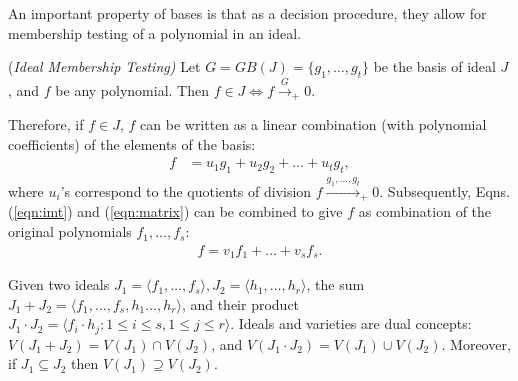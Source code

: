 An important property of \Grobner bases is that as a decision
procedure, they allow for membership testing of a polynomial in an
ideal. 

\begin{Proposition}
\label{prop:imt}
({\it Ideal Membership Testing)
} 
Let $G = GB(J) = \{g_1,\dots,g_t\}$ be the \Grobner basis of ideal
$J$, and $f$ be any polynomial. Then $f\in J \iff f\xrightarrow{G}_+0$.
\end{Proposition}

Therefore, if $f\in J$, $f$ can
be written as a linear combination (with polynomial coefficients) of
the elements of the \Grobner basis: 
\vspace{-0.1in}
\begin{align}\label{eqn:imt}
f & = u_1g_1 + u_2g_2+ \dots+ u_tg_t,
\end{align}
where $u_i$'s correspond to the quotients of division
$f\xrightarrow{g_1,\dots,g_t}_+0$. Subsequently, Eqns. (\ref{eqn:imt})
and (\ref{eqn:matrix}) can be combined to give $f$ as combination of
the original polynomials $f_1,\dots,f_s$:
\begin{align}\label{eqn:imt_orig}
f = v_1f_1 +\dots+v_sf_s.
\end{align}




Given two ideals $J_1 = \langle f_1,\dots,f_s\rangle, J_2=\langle
h_1,\dots,h_r\rangle$, the sum $J_1 + J_2 = \langle
f_1,\dots,f_s,h_1\dots,h_r\rangle$, and their product $J_1\cdot J_2 =
\langle f_i\cdot h_j: 1\leq i\leq s, 1\leq j\leq r\rangle$. Ideals and
varieties are dual concepts: $V(J_1 + J_2) = V(J_1) \cap V(J_2)$, and
$V(J_1\cdot J_2) = V(J_1) \cup V(J_2)$. Moreover, if $J_1 \subseteq
J_2$ then $V(J_1)\supseteq V(J_2)$.


